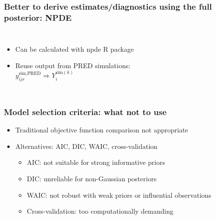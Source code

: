 \documentclass{beamer}
\begin{document}
\begin{frame}
  \frametitle{Better to derive estimates/diagnostics using the full posterior: NPDE}

  \begin{columns}
\begin{itemize}
  \item Can be calculated with npde R package
  \item Reuse output from PRED simulations:\\
  $y_{ijs}^{\text{sim,PRED}} \Rightarrow Y_i^{\text{sim}(k)}$
\end{itemize}
    \cite{Comets2008-lz}
  \end{columns}

\end{frame}

\begin{frame}
  \frametitle{Model selection criteria: what not to use}

\begin{itemize}
  \item Traditional objective function comparison not appropriate
  \item Alternatives: AIC, DIC, WAIC, cross-validation
        \begin{itemize}
          \item \textcolor{mrggreen}{AIC}: not suitable for strong informative priors
          \item \textcolor{mrggreen}{DIC}: unreliable for non-Gaussian posteriors
          \item \textcolor{mrggreen}{WAIC}: not robust with weak priors or influential observations
          \item \textcolor{mrggreen}{Cross-validation}: too computationally demanding
        \end{itemize}
\end{itemize}

\end{frame}
\end{document}
